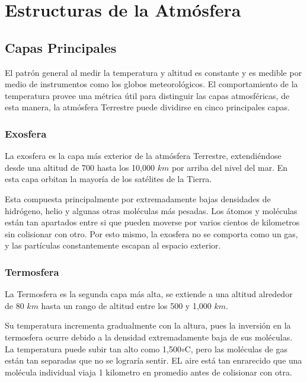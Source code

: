 \documentclass{article} %
\begin{document}
\section{Estructuras de la Atmósfera}
	\subsection{Capas Principales}



El patrón general al medir la temperatura y altitud es constante y es medible por medio de instrumentos como los globos meteorológicos. El comportamiento de la temperatura provee una métrica útil para distinguir las capas atmosféricas, de esta manera, la atmósfera Terrestre puede dividirse en cinco principales capas.

    \subsubsection{Exosfera}
    La exosfera es la capa más exterior de la atmósfera Terrestre, extendiéndose desde una altitud de 700 hasta los 10,000 $km$ por arriba del nivel del mar. En esta capa orbitan la mayoría de los satélites de la Tierra.
    
    Esta compuesta principalmente por extremadamente bajas densidades de hidrógeno, helio y algunas otras moléculas más pesadas. Los átomos y moléculas están tan apartados entre si que pueden moverse por varios cientos de kilometros sin colisionar con otro. Por esto mismo, la exosfera no se comporta como un gas, y las partículas constantemente escapan al espacio exterior.
    
    \subsubsection{Termosfera}
    La Termosfera es la segunda capa más alta, se extiende a una altitud alrededor de 80 $km$ hasta un rango de altitud entre los 500 y 1,000 $km$.
    
    Su temperatura incrementa gradualmente con la altura, pues la inversión en la termosfera ocurre debido a la densidad extremadamente baja de sus moléculas. La temperatura puede subir tan alto como 1,500$\circ$C, pero las moléculas de gas están tan separadas que no se lograría sentir. EL aire está tan enrarecido que una molécula individual viaja 1 kilometro en promedio antes de colisionar con otra. 
    
\end{document}
